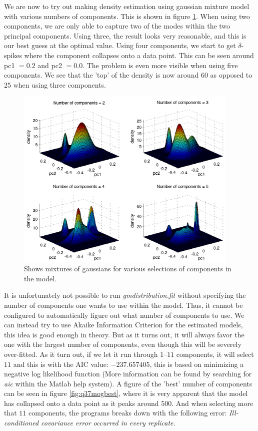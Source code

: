\newpage

We are now to try out making density estimation using gaussian mixture
model with various numbers of components. This is shown in figure
\ref{fig:q37mog}. When using two components, we are only able to
capture two of the modes within the two principal components. Using
three, the result looks very reasonable, and this is our best guess at
the optimal value. Using four components, we start to get $\delta$-spikes
where the component collapses onto a data point. This can be seen
around pc1 $= 0.2$ and pc2 $= 0.0$. The problem is even more visible
when using five components. We see that the 'top' of the density is
now around $60$ as opposed to $25$ when using three components.

\begin{figure}[!htbp]
  \centering
  \includegraphics[width=0.95\textwidth]{./images/q37mog}
  \caption{Shows mixtures of gaussians for various selections of
    components in the model.}
  \label{fig:q37mog}
\end{figure}

It is unfortunately not possible to run \emph{gmdistribution.fit}
without specifying the number of components one wants to use within
the model. Thus, it cannot be configured to automatically figure out what
number of components to use. We can instead try to use Akaike
Information Criterion for the estimated models, this idea is good
enough in theory. But as it turns out, it will always favor the one
with the largest number of components, even though this will be
severely over-fitted. As it turn out, if we let it run through
$1$--$11$ components, it will select $11$ and this is with the AIC
value: $-237.657405$, this is based on minimizing a negative log
likelihood function (More information can be found by searching for
\emph{aic} within the Matlab help system). A figure of the 'best'
number of components can be seen in figure \ref{fig:q37mogbest}, where it is
very apparent that the model has collapsed onto a data point as it
peaks around $500$. And when selecting more that $11$ components, the
programs breaks down with the following error: \emph{Ill-conditioned
  covariance error occurred in every replicate.}

